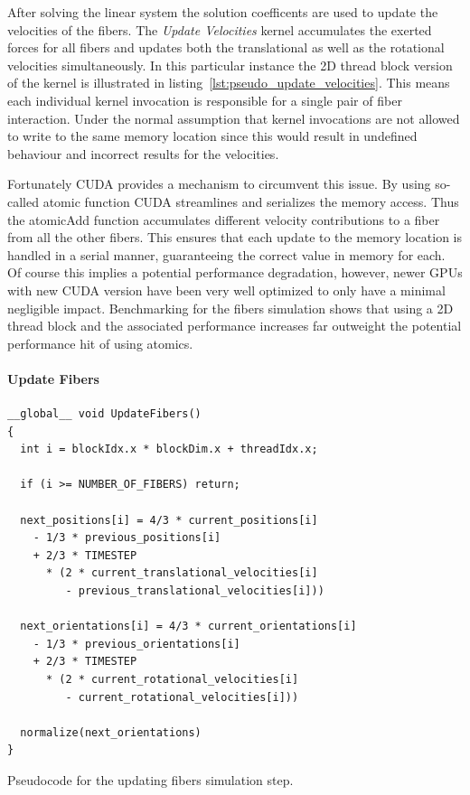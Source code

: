\documentclass[a4paper,11pt]{kth-mag}
\begin{document}
After solving the linear system the solution coefficents are used to update the velocities of the fibers. The \emph{Update Velocities} kernel accumulates the exerted forces for all fibers and updates both the translational as well as the rotational velocities simultaneously. In this particular instance the 2D thread block version of the kernel is illustrated in listing~\ref{lst:pseudo_update_velocities}. This means each individual kernel invocation is responsible for a single pair of fiber interaction. Under the normal assumption that kernel invocations are not allowed to write to the same memory location since this would result in undefined behaviour and incorrect results for the velocities.

Fortunately CUDA provides a mechanism to circumvent this issue. By using so-called atomic function CUDA streamlines and serializes the memory access. Thus the atomicAdd function accumulates different velocity contributions to a fiber from all the other fibers. This ensures that each update to the memory location is handled in a serial manner, guaranteeing the correct value in memory for each. Of course this implies a potential performance degradation, however, newer GPUs with new CUDA version have been very well optimized to only have a minimal negligible impact. Benchmarking for the fibers simulation shows that using a 2D thread block and the associated performance increases far outweight the potential performance hit of using atomics.

\paragraph{Update Fibers}

\begin{listing}[!htbp]
  \centering
  \begin{verbatim}
__global__ void UpdateFibers()
{
  int i = blockIdx.x * blockDim.x + threadIdx.x;

  if (i >= NUMBER_OF_FIBERS) return;

  next_positions[i] = 4/3 * current_positions[i]
    - 1/3 * previous_positions[i]
    + 2/3 * TIMESTEP
      * (2 * current_translational_velocities[i]
         - previous_translational_velocities[i]))

  next_orientations[i] = 4/3 * current_orientations[i]
    - 1/3 * previous_orientations[i]
    + 2/3 * TIMESTEP
      * (2 * current_rotational_velocities[i]
         - current_rotational_velocities[i]))

  normalize(next_orientations)
}
  \end{verbatim}
  \caption{Pseudocode for the updating fibers simulation step.}
  \label{lst:pseudo_update_fibers}
\end{listing}
\end{document}
